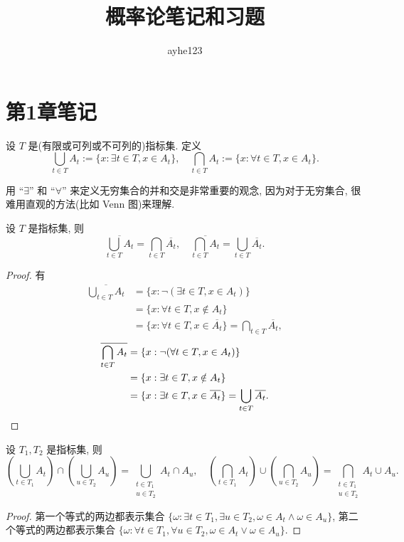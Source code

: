 \documentclass{ctexart}
\title{概率论笔记和习题}
\author{ayhe123}
\begin{document}
\maketitle
\section{第1章笔记}
设 $T$ 是(有限或可列或不可列的)指标集. 定义
\begin{equation}\label{eq1.1}
    \bigcup\limits_{t\in T}A_t:=\{x:\exists t\in T,x\in A_t\},\quad\bigcap\limits_{t\in T}A_t:=\{x:\forall t\in T,x\in A_t\}.
\end{equation}

用 ``$\exists$'' 和 ``$\forall$'' 来定义无穷集合的并和交是非常重要的观念, 因为对于无穷集合, 很难用直观的方法(比如 Venn 图)来理解.
\begin{theorem}[De-Morgan]\label{t1.1}
    设 $T$ 是指标集, 则
    \[\overline{\bigcup\limits_{t\in T}A_t}=\bigcap\limits_{t\in T}\overline{A_t},\quad\overline{\bigcap\limits_{t\in T}A_t}=\bigcup\limits_{t\in T}\overline{A_t}.\]
\end{theorem}
\begin{proof}
    有
    \begin{align*}
        \overline{\bigcup\limits_{t\in T}A_t} & =\{x:\neg(\exists t\in T,x\in A_t)\} \\
        & =\{x:\forall t\in T,x\notin A_t\} \\
        & =\{x:\forall t\in T,x\in \overline{A_t}\}=\bigcap\limits_{t\in T}\overline{A_t},
    \end{align*}
    \begin{align*}
        \overline{\bigcap\limits_{t\in T}A_t} & =\{x:\neg(\forall t\in T,x\in A_t)\} \\
        & =\{x:\exists t\in T,x\notin A_t\} \\
        & =\{x:\exists t\in T,x\in\overline{A_t}\}=\bigcup\limits_{t\in T}\overline{A_t}.\qedhere
    \end{align*}
\end{proof}
\begin{theorem}\label{t1.2}
    设 $T_1,T_2$ 是指标集, 则
    \[\left(\bigcup\limits_{t\in T_1}A_t\right)\cap\left(\bigcup\limits_{u\in T_2}A_u\right)=\bigcup\limits_{\substack{t\in T_1\\u\in T_2}}A_t\cap A_u,\quad\left(\bigcap\limits_{t\in T_1}A_t\right)\cup\left(\bigcap\limits_{u\in T_2}A_u\right)=\bigcap\limits_{\substack{t\in T_1\\u\in T_2}}A_t\cup A_u.\]
\end{theorem}
\begin{proof}
    第一个等式的两边都表示集合 $\{\omega:\exists t\in T_1,\exists u\in T_2,\omega\in A_t\wedge\omega\in A_u\}$, 第二个等式的两边都表示集合 $\{\omega:\forall t\in T_1,\forall u\in T_2,\omega\in A_t\vee\omega\in A_u\}$.
\end{proof}
\end{document}
